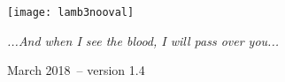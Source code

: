 \documentclass[10pt,oneside,footinclude=true,headinclude=true]{scrbook} %
\begin{document}
\begin{titlepage}
\begin{center}
\large \hfill \vfill

\begingroup
\color{RoyalPurple} \\
\bigskip
\color{RoyalPurple} \\ %
\bigskip
\endgroup

\bigskip\bigskip
\bigskip\bigskip
\bigskip\bigskip
\bigskip
\texttt{[image: lamb3nooval]} \\
\bigskip
\bigskip\bigskip
\bigskip\bigskip

\textit{...And when I see the blood, I will pass over you...} \\ \medskip %

March 2018\ -- version 1.4 %

\vfill
\end{center}
\end{titlepage}
    
\end{document}
